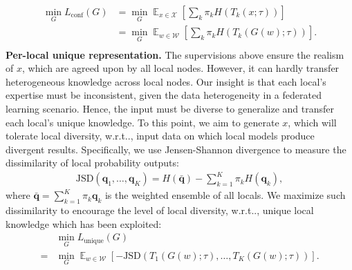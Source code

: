 \documentclass[letterpaper]{article} %
\makeatletter
\DeclareRobustCommand\onedot{\futurelet\@let@token\@onedot}
\def\@onedot{\ifx\@let@token.\else.\null\fi\xspace}
\DeclareMathOperator*{\fe}{\mathbb{E}}
\def\wrt{w.r.t\onedot} \def\dof{d.o.f\onedot}
\newcommand{\domw}{\mathcal{W}}
\newcommand{\domx}{\mathcal{X}}
\makeatother
\begin{document}
\begin{equation}
\label{eq:confloss}
\begin{aligned}
    \min_{G} L_\text{conf}(G) &= \min_{G} \fe_{x \in \domx} [\sum_k{ \pi_k H (T_k(x; \tau))}] \\
    & =\min_{G}\fe_{w \in \domw} [\sum_k{\pi_k H (T_k(G(w); \tau))}]. \\
\end{aligned}
\end{equation}
\textbf{Per-local unique representation.}
The supervisions above ensure the realism of $x$, which are agreed upon by all local nodes. However, it can hardly transfer heterogeneous knowledge across local nodes. Our insight is that each local's expertise must be inconsistent, given the data heterogeneity in a federated learning scenario. Hence, the input must be diverse to generalize and transfer each local's unique knowledge.
To this point, we aim to generate $x$, which will tolerate local diversity, \wrt, input data on which local models produce divergent results. Specifically, we use Jensen-Shannon divergence to measure the dissimilarity of local probability outputs:
\begin{equation}
\label{eq:jsd}
    \begin{aligned}
        \text{JSD}(\bm{q}_1, \dots, \bm{q}_K) = H(\bar{\bm{q}}) - \sum_{k=1}^K \pi_k H(\bm{q}_k),
    \end{aligned}
\end{equation}
where $\bar{\bm{q}} = \sum_{k=1}^{K} \pi_k \bm{q}_k$ is the weighted ensemble of all locals.
We maximize such dissimilarity to encourage the level of local diversity, \wrt, unique local knowledge which has been exploited:
\begin{equation}
\label{eq:uniqueloss}
\begin{aligned}
    &\min_{G} L_\text{unique} (G) \\ 
    = & \min_{G} \fe_{w \in \domw} [-\text{JSD}(T_1(G(w); \tau), \dots, T_K(G(w); \tau)) ].\\
\end{aligned}
\end{equation}
\end{document}
